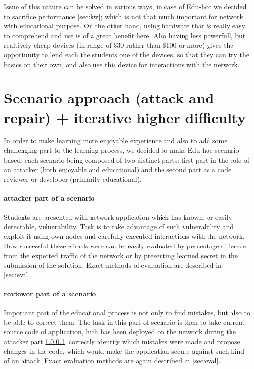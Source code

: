 \documentclass[
  digital, %
  table,   %
  nolof,     %
  nolot,     %
           oneside
]{fithesis3}
\begin{document}
  Issue of this nature can be solved in various ways,
  in case of Edu-hoc we decided to sacrifice performance \ref{sec:hw}; which is not that much important for network with educational purpose. On the other hand, using hardware that is really easy to comprehend and use is of a great benefit here. Also having less powerfull, but realtively cheap devices (in range of \$30 rather than \$100 or more) gives the opportunity to lend each the students one of the devices, so that they can try the basics on their own, and also use this device for interactions with the network.

  \section{Scenario approach (attack and repair) + iterative higher difficulty}
  In order to make learning more enjoyable experience and also to add some challenging part to the learning process, we decided to make Edu-hoc scenario based; each scenario being composed of two distinct parts: first part in the role of an attacker (both enjoyable and educational) and the second part as a code reviewer or developer (primarily educational).

  \paragraph{attacker part of a scenario}\label{par:att}
    Students are presented with network application which has known, or easily detectable, vulnerability. Task is to take advantage of such vulnerability and exploit it using own nodes and carefully executed interactions with the network. How successful these effords were can be easily evaluated by percentage differece from the expected traffic of the network or by presenting learned secret in the submission of the solution. Exact methods of evaluation are described in \ref{sec:eval}.

  \paragraph{reviewer part of a scenario}
    Important part of the educational process is not only to find mistakes, but also to be able to correct them. The task in this part of scenario is then to take current source code of application, hich has been deployed on the network during the attacker part \ref{par:att}, correctly identify which mistakes were made and propose changes in the code, which would make the application secure against such kind of an attack. Exact evaluation methods are again described in \ref{sec:eval}.
\end{document}
